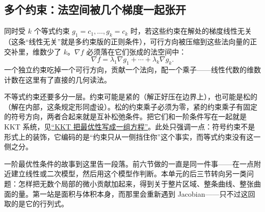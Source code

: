 \subsection{多个约束：法空间被几个梯度一起张开}

同时受 \(k\) 个等式约束 \(g_1=c_1,\dots,g_k=c_k\) 时，若这些约束在解处的梯度线性无关（这条``线性无关''就是多约束版的正则条件），可行方向被压缩到这些法向量的正交补里，维数少了 \(k\)。\(\nabla f\) 必须落在它们张成的法空间中：
\[
\nabla f=\lambda_1\nabla g_1+\cdots+\lambda_k\nabla g_k .
\]
一个独立约束吃掉一个可行方向，贡献一个法向，配一个乘子——线性代数的维数计数在这里有了直接的几何读法。

不等式约束还要多分一层。约束可能是紧的（解正好压在边界上），也可能是松的（解在内部，这条规定形同虚设）。松的约束乘子必须为零，紧的约束乘子有固定的符号方向，两者合起来就是互补松弛条件。把它们和一阶条件写在一起就是 KKT 系统，见\hyperref[sec:09-Convex-Optimization/05-Duality/03]{``KKT 把最优性写成一组方程''}。此处只强调一点：符号约束不是形式上的装饰，它编码的是``约束只从一侧挡住你''这个事实，而等式约束没有这一侧之分。

一阶最优性条件的故事到这里告一段落。前六节做的一直是同一件事——在一点附近建立线性或二次模型，然后用这个模型作判断。本单元的后三节转向另一类问题：怎样把无数个局部的微小贡献加起来，得到关于整片区域、整条曲线、整张曲面的量。第一站是面积与体积本身，而那里会重新遇到 Jacobian——只不过这回取的是它的行列式。
